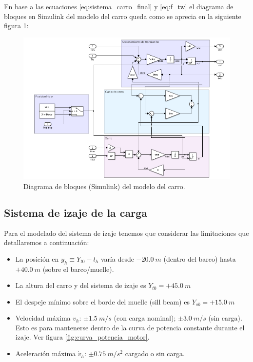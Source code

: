 \documentclass[11pt]{article}
\begin{document}
En base a las ecuaciones \ref{eq:sistema_carro_final} y \ref{eq:f_tw} el diagrama de bloques en Simulink del modelo del carro queda como se aprecia en la siguiente figura \ref{fig:sistema_carro_simulink}:

\begin{figure}[h!]
	\centering
	\includegraphics[width=1\textwidth]{images/imagen_3_simulink_carro.png}
	\caption{Diagrama de bloques (Simulink) del modelo del carro.}
	\label{fig:sistema_carro_simulink}
\end{figure}

\newpage

\subsection{Sistema de izaje de la carga}
\label{section:izaje}

Para el modelado del sistema de izaje tenemos que considerar las limitaciones que detallaremos a continuación:
\begin{itemize}
	\item La posición en $y_{h}\equiv Y_{t0}-l_{h}$ varía desde $-20.0\ m$ (dentro del barco) hasta $+40.0\ m$ (sobre el barco/muelle).
	\item La altura del carro y del sistema de izaje es $Y_{t0}= +45.0\ m$
	\item El despeje mínimo sobre el borde del muelle (sill beam) es $Y_{sb}= +15.0\ m$
	\item Velocidad máxima $v_{h}$: $\pm 1.5\ m/s$ (con carga nominal); $\pm 3.0\ m/s$ (sin carga). Esto es para mantenerse dentro de la curva de potencia constante durante el izaje. Ver figura \ref{fig:curva_potencia_motor}.
	\item Aceleración máxima $\dot{v}_{h}$: $\pm 0.75\ m/s^{2}$ cargado o sin carga.
\end{itemize}
\end{document}
